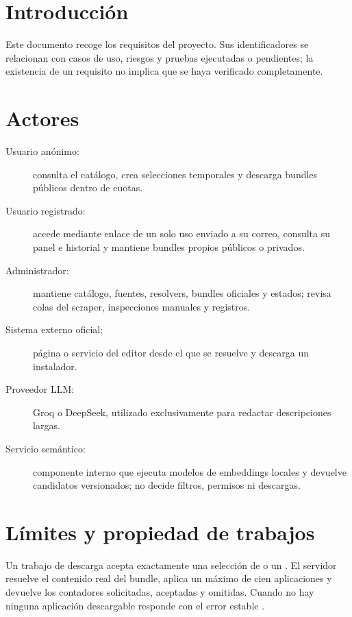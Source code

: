 
\section{Introducción}

Este documento recoge los requisitos del proyecto. Sus identificadores se relacionan con casos de uso, riesgos y pruebas ejecutadas o pendientes; la existencia de un requisito no implica que se haya verificado completamente.

\section{Actores}

\begin{description}
	\item[Usuario anónimo:] consulta el catálogo, crea selecciones temporales y descarga bundles públicos dentro de cuotas.
	\item[Usuario registrado:] accede mediante enlace de un solo uso enviado a su correo, consulta su panel e historial y mantiene bundles propios públicos o privados.
	\item[Administrador:] mantiene catálogo, fuentes, resolvers, bundles oficiales y estados; revisa colas del scraper, inspecciones manuales y registros.
	\item[Sistema externo oficial:] página o servicio del editor desde el que se resuelve y descarga un instalador.
	\item[Proveedor LLM:] Groq o DeepSeek, utilizado exclusivamente para redactar descripciones largas.
	\item[Servicio semántico:] componente interno que ejecuta modelos de embeddings locales y devuelve candidatos versionados; no decide filtros, permisos ni descargas.
\end{description}

\section{Límites y propiedad de trabajos}

Un trabajo de descarga acepta exactamente una selección de  o un . El servidor resuelve el contenido real del bundle, aplica un máximo de cien aplicaciones y devuelve los contadores solicitadas, aceptadas y omitidas. Cuando no hay ninguna aplicación descargable responde con el error estable .

